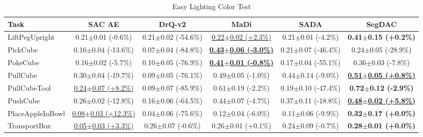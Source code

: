 \begin{table}[htbp]
\centering
\scriptsize
\caption{Easy Lighting Color Test}
\label{tab:appendix_lightingcolortest_easy}
\begin{adjustbox}{max width=\textwidth}
\begin{tabular}{l*{5}{c}}
\toprule
\textbf{Task} & \textbf{SAC AE} & \textbf{DrQ-v2} & \textbf{MaDi} & \textbf{SADA} & \textbf{SegDAC} \\
\midrule
LiftPegUpright & 0.21$\pm$0.01 \scriptsize{(-0.6\%)} & 0.21$\pm$0.02 \scriptsize{(-54.6\%)} & \underline{0.22$\pm$0.02 \scriptsize{(+2.3\%)}} & 0.21$\pm$0.01 \scriptsize{(-4.2\%)} & \textbf{0.41$\pm$0.15 \scriptsize{(+0.2\%)}} \\
PickCube & 0.16$\pm$0.04 \scriptsize{(-13.6\%)} & 0.07$\pm$0.04 \scriptsize{(-84.8\%)} & \textbf{\underline{0.43$\pm$0.06 \scriptsize{(-3.0\%)}}} & 0.21$\pm$0.07 \scriptsize{(-46.4\%)} & 0.24$\pm$0.05 \scriptsize{(-28.9\%)} \\
PokeCube & 0.16$\pm$0.02 \scriptsize{(-5.7\%)} & 0.10$\pm$0.05 \scriptsize{(-76.9\%)} & \textbf{\underline{0.41$\pm$0.01 \scriptsize{(-0.8\%)}}} & 0.17$\pm$0.04 \scriptsize{(-55.1\%)} & 0.36$\pm$0.03 \scriptsize{(-7.8\%)} \\
PullCube & 0.30$\pm$0.04 \scriptsize{(-19.7\%)} & 0.09$\pm$0.05 \scriptsize{(-76.1\%)} & 0.49$\pm$0.05 \scriptsize{(-1.0\%)} & 0.44$\pm$0.14 \scriptsize{(-9.0\%)} & \textbf{\underline{0.51$\pm$0.05 \scriptsize{(+0.8\%)}}} \\
PullCubeTool & \underline{0.24$\pm$0.07 \scriptsize{(+8.2\%)}} & 0.09$\pm$0.07 \scriptsize{(-85.9\%)} & 0.61$\pm$0.19 \scriptsize{(-2.2\%)} & 0.19$\pm$0.10 \scriptsize{(-47.4\%)} & \textbf{0.72$\pm$0.12 \scriptsize{(-2.9\%)}} \\
PushCube & 0.26$\pm$0.02 \scriptsize{(-12.8\%)} & 0.16$\pm$0.06 \scriptsize{(-64.5\%)} & 0.44$\pm$0.07 \scriptsize{(-4.7\%)} & 0.37$\pm$0.11 \scriptsize{(-18.8\%)} & \textbf{\underline{0.48$\pm$0.02 \scriptsize{(+5.8\%)}}} \\
PlaceAppleInBowl & \underline{0.08$\pm$0.03 \scriptsize{(+12.3\%)}} & 0.04$\pm$0.06 \scriptsize{(-75.6\%)} & 0.12$\pm$0.04 \scriptsize{(-6.0\%)} & 0.11$\pm$0.06 \scriptsize{(-9.9\%)} & \textbf{0.32$\pm$0.17 \scriptsize{(+0.0\%)}} \\
TransportBox & \underline{0.05$\pm$0.03 \scriptsize{(+3.3\%)}} & 0.26$\pm$0.07 \scriptsize{(-0.6\%)} & 0.26$\pm$0.01 \scriptsize{(+0.1\%)} & 0.24$\pm$0.09 \scriptsize{(-0.7\%)} & \textbf{0.28$\pm$0.01 \scriptsize{(+0.0\%)}} \\
\bottomrule
\end{tabular}
\end{adjustbox}
\end{table}


